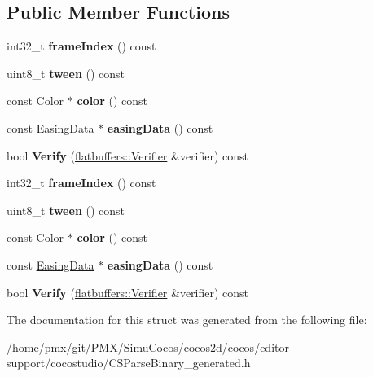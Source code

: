 \subsection*{Public Member Functions}
\begin{DoxyCompactItemize}
\item 
\mbox{\label{structflatbuffers_1_1ColorFrame_af3cabdafe602849c19f63e2637f34dd0}} 
int32\+\_\+t {\bfseries frame\+Index} () const
\item 
\mbox{\label{structflatbuffers_1_1ColorFrame_a65074871053402ce0ab7e0c9f14d90a5}} 
uint8\+\_\+t {\bfseries tween} () const
\item 
\mbox{\label{structflatbuffers_1_1ColorFrame_abd29b7f3da4cb99b3206cbbeccc4403a}} 
const Color $\ast$ {\bfseries color} () const
\item 
\mbox{\label{structflatbuffers_1_1ColorFrame_a94610ae416027add10091c87de6c7a9d}} 
const \hyperlink{structflatbuffers_1_1EasingData}{Easing\+Data} $\ast$ {\bfseries easing\+Data} () const
\item 
\mbox{\label{structflatbuffers_1_1ColorFrame_ab0ad311a97cc418e6a7a6a6694e69ca8}} 
bool {\bfseries Verify} (\hyperlink{classflatbuffers_1_1Verifier}{flatbuffers\+::\+Verifier} \&verifier) const
\item 
\mbox{\label{structflatbuffers_1_1ColorFrame_af3cabdafe602849c19f63e2637f34dd0}} 
int32\+\_\+t {\bfseries frame\+Index} () const
\item 
\mbox{\label{structflatbuffers_1_1ColorFrame_a65074871053402ce0ab7e0c9f14d90a5}} 
uint8\+\_\+t {\bfseries tween} () const
\item 
\mbox{\label{structflatbuffers_1_1ColorFrame_abd29b7f3da4cb99b3206cbbeccc4403a}} 
const Color $\ast$ {\bfseries color} () const
\item 
\mbox{\label{structflatbuffers_1_1ColorFrame_a94610ae416027add10091c87de6c7a9d}} 
const \hyperlink{structflatbuffers_1_1EasingData}{Easing\+Data} $\ast$ {\bfseries easing\+Data} () const
\item 
\mbox{\label{structflatbuffers_1_1ColorFrame_ab0ad311a97cc418e6a7a6a6694e69ca8}} 
bool {\bfseries Verify} (\hyperlink{classflatbuffers_1_1Verifier}{flatbuffers\+::\+Verifier} \&verifier) const
\end{DoxyCompactItemize}


The documentation for this struct was generated from the following file\+:\begin{DoxyCompactItemize}
\item 
/home/pmx/git/\+P\+M\+X/\+Simu\+Cocos/cocos2d/cocos/editor-\/support/cocostudio/C\+S\+Parse\+Binary\+\_\+generated.\+h\end{DoxyCompactItemize}
